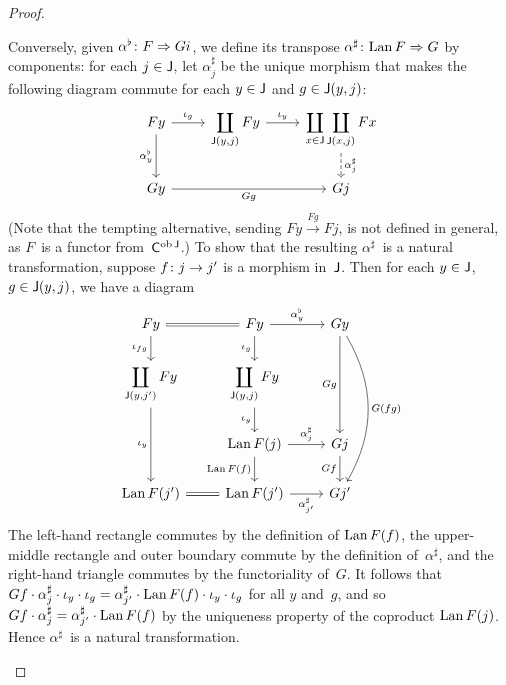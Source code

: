 \documentclass[../../solutions]{subfiles}
\begin{document}
\begin{proof}
\begin{enumerate}[label=(\roman*)]
    Conversely, given ${\alpha^\flat}\colon{F}\Rightarrow{Gi}$, we define its
    transpose ${\alpha^\sharp}\colon{\operatorname{Lan}F}\Rightarrow{G}$ by components: for
    each $j\in{\mathsf{J}}$, let $\alpha^\sharp_j$ be the unique morphism that
    makes the following diagram commute for each $y\in{\mathsf{J}}$ and
    $g\in{\mathsf{J}}(y,j)$:
    $$
    \begin{tikzcd}
      Fy \ar[r, "\iota_g"] \ar[d, "\alpha^\flat_y"']
      & \displaystyle \coprod_{\sJ(y,j)} Fy \ar[r, "\iota_y"]
      & \displaystyle \coprod_{x\in\sJ\vphantom{j}}\coprod_{\sJ(x,j)} Fx
      \ar[d, dashed, "\alpha^\sharp_j"]
      \\
      Gy
      \ar[rr, "Gg"']
      && Gj
    \end{tikzcd}
    $$
    (Note that the tempting alternative, sending
    $Fy\xrightarrow{Fg}Fj$, is not defined in general, as $F$~is a
    functor from~${\mathsf{C}}^{\operatorname{ob}{\mathsf{J}}}$.)  To show that the resulting
    $\alpha^\sharp$~is a natural transformation, suppose
    ${f}\colon{j}\to{j'}$ is a morphism in~${\mathsf{J}}$.  Then for each
    $y\in{\mathsf{J}}$, $g\in{\mathsf{J}}(y,j)$, we have a diagram
    $$
    \begin{tikzcd}
      Fy \ar[r, equal] \ar[d, "\iota_{fg}"']
      & Fy \ar[r, "\alpha^\flat_y"] \ar[d, "\iota_g"']
      & Gy \ar[dd, "Gg"'] \ar[ddd, bend left=30, "G(fg)"]
      \\
      \displaystyle \coprod_{\sJ(y,j')} Fy \ar[dd, "\iota_y"']
      & \displaystyle \coprod_{\sJ(y,j)} Fy \ar[d, "\iota_y"']
      \\
      & \Lan F(j) \ar[r, "\alpha^\sharp_j"] \ar[d, "\Lan F(f)"']
      & Gj \ar[d, "Gf"']
      \\
      \Lan F(j') \ar[r, equal]
      & \Lan F(j') \ar[r, "\alpha^\sharp_{j'}"']
      & Gj'
    \end{tikzcd}
    $$
    The left-hand rectangle commutes by the definition of $\operatorname{Lan} F(f)$,
    the upper-middle rectangle and outer boundary commute by the
    definition of~$\alpha^\sharp$, and the right-hand triangle
    commutes by the functoriality of~$G$.  It follows that $Gf\cdot
    \alpha^\sharp_j\cdot \iota_y\cdot \iota_g = \alpha^\sharp_{j'}
    \cdot \operatorname{Lan} F(f)\cdot \iota_y\cdot \iota_g$ for all $y$ and~$g$,
    and so $Gf\cdot \alpha^\sharp_j = \alpha^\sharp_{j'} \cdot \operatorname{Lan}
    F(f)$ by the uniqueness property of the coproduct $\operatorname{Lan} F(j)$.
    Hence $\alpha^\sharp$~is a natural transformation.


\end{enumerate}
\end{proof}
\end{document}
